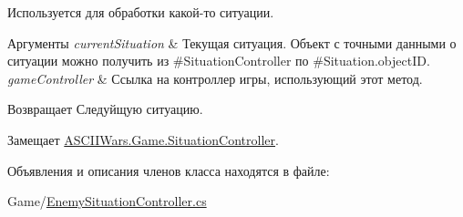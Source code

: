 Используется для обработки какой-\/то ситуации. 


\begin{DoxyParams}{Аргументы}
{\em current\+Situation} & Текущая ситуация. Объект с точными данными о ситуации можно получить из \#\+Situation\+Controller по \#\+Situation.\+object\+ID. \\
\hline
{\em game\+Controller} & Ссылка на контроллер игры, использующий этот метод. \\
\hline
\end{DoxyParams}
\begin{DoxyReturn}{Возвращает}
Следуйщую ситуацию. 
\end{DoxyReturn}


Замещает \hyperlink{interface_a_s_c_i_i_wars_1_1_game_1_1_situation_controller_a2cf0359dfc1683beb63f0dfed1c372e6}{A\+S\+C\+I\+I\+Wars.\+Game.\+Situation\+Controller}.



Объявления и описания членов класса находятся в файле\+:\begin{DoxyCompactItemize}
\item 
Game/\hyperlink{_enemy_situation_controller_8cs}{Enemy\+Situation\+Controller.\+cs}\end{DoxyCompactItemize}
